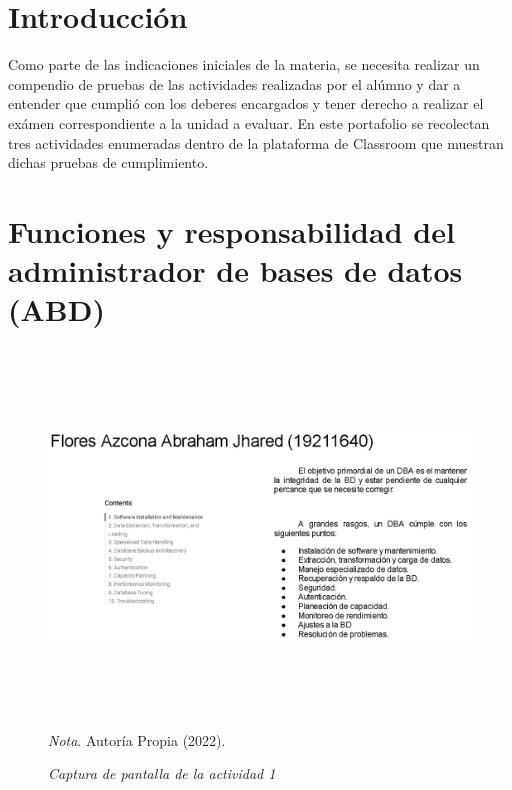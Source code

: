 \documentclass[stu, 12pt, letterpaper, donotrepeattitle, floatsintext, natbib]{apa7}
\begin{document}
\section{Introducción}
    \begin{justifying}
Como parte de las indicaciones iniciales de la materia, se necesita realizar un compendio de pruebas
de las actividades realizadas por el alúmno y dar a entender que cumplió con los deberes encargados y tener derecho a realizar el exámen 
correspondiente a la unidad a evaluar. En este portafolio se recolectan tres actividades enumeradas dentro de la plataforma de Classroom que 
muestran dichas pruebas de cumplimiento.\par
    \end{justifying}
\vspace{\baselineskip}
\section{Funciones y responsabilidad del administrador de bases de datos (ABD)}
    \begin{figure}[H]
        \caption{\emph{Captura de pantalla de la actividad 1\\}}
        \centering
        \smallskip
        \includegraphics[width=17cm, height=10cm]{act_1.3.jpg}
        \bigskip
        \justifying\small\textit{Nota}. %
        Autoría Propia (2022).
\end{figure}
\vspace{\baselineskip}
\end{document}
